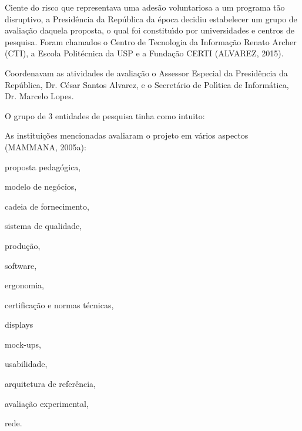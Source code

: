 \documentclass[
12pt,		%
openright,	%
twoside,  %
a4paper,			%
chapter=TITLE,		%
english,			%
french,				%
spanish,			%
brazil				%
]{USPSC-classe/USPSC}
\begin{document}
Ciente do risco que representava uma ades\~ao voluntariosa a um programa t\~ao disruptivo, a Presid\^encia da Rep\'ublica da \'epoca decidiu estabelecer um grupo de avalia\c{c}\~ao  daquela proposta, o  qual foi constitu\'{\i}do por universidades e centros de pesquisa. Foram chamados o Centro de Tecnologia da Informa\c{c}\~ao Renato Archer (CTI), a Escola Polit\'ecnica da USP e a Funda\c{c}\~ao CERTI (ALVAREZ, 2015).










Coordenavam as atividades de avalia\c{c}\~ao o Assessor Especial da Presid\^encia da Rep\'ublica, Dr. C\'esar Santos Alvarez, e o Secret\'ario de Pol\'{\i}tica de Inform\'atica, Dr. Marcelo Lopes.










O grupo de 3 entidades de pesquisa tinha como intuito:











\noindent\begin{center}\mbox{\centering{}}\end{center}


As institui\c{c}\~oes mencionadas avaliaram o projeto em v\'arios aspectos  (MAMMANA, 2005a):











\begin{alineas}
\item proposta pedag\'ogica,
\item modelo de neg\'ocios,
\item cadeia de fornecimento,
\item sistema de qualidade,
\item produ\c{c}\~ao,
\item software,
\item ergonomia,
\item certifica\c{c}\~ao e normas t\'ecnicas,
\item displays
\item mock-ups,
\item usabilidade,
\item arquitetura de refer\^encia,
\item avalia\c{c}\~ao experimental,
\item rede.
\end{alineas}
\end{document}
